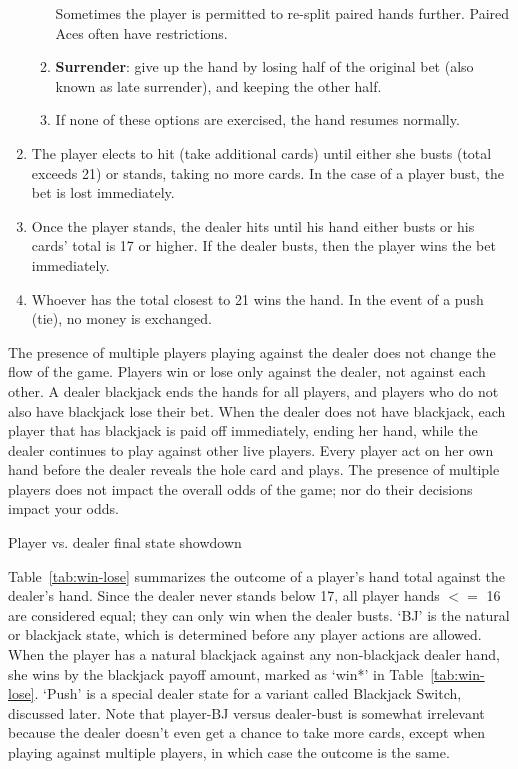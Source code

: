 \begin{enumerate}
\begin{enumerate}
Sometimes the player is permitted to re-split paired hands further.
Paired Aces often have restrictions.  
\item \textbf{Surrender}: give up the hand by losing half of 
the original bet (also known as late surrender), and keeping the other half.
\item If none of these options are exercised, the hand resumes normally.
\end{enumerate}
\item The player elects to hit (take additional cards) until either
she busts (total exceeds 21) or stands, taking no more cards.
In the case of a player bust, the bet is lost immediately.
\item Once the player stands, the dealer hits until his hand either busts
or his cards' total is 17 or higher.  
If the dealer busts, then the player wins the bet immediately.  
\item Whoever has the total closest to 21 wins the hand.
In the event of a push (tie), no money is exchanged.
\end{enumerate}


The presence of multiple players playing against the dealer does not
change the flow of the game.
Players win or lose only against the dealer, not against each other.
A dealer blackjack ends the hands for all players,
and players who do not also have blackjack lose their bet.
When the dealer does not have blackjack,
each player that has blackjack is paid off immediately, ending her hand, 
while the dealer continues to play against other live players.  
Every player act on her own hand before the dealer reveals the 
hole card and plays.  
The presence of multiple players does not impact the overall 
odds of the game; nor do their decisions impact your odds.

\begin{table}[ht!]
\caption{Player vs. dealer final state showdown}
\begin{center}

\end{center}
\label{tab:win-lose}
\end{table}

Table~\ref{tab:win-lose} summarizes the outcome of a player's hand total
against the dealer's hand.
Since the dealer never stands below 17, all player hands $<=$ 16
are considered equal; they can only win when the dealer busts.
`BJ' is the natural or blackjack state, which is determined 
before any player actions are allowed.
When the player has a natural blackjack against any non-blackjack 
dealer hand, she wins by the blackjack payoff amount, marked as `win*'
in Table~\ref{tab:win-lose}.  
`Push' is a special dealer state for a variant called Blackjack Switch, 
discussed later.
Note that player-BJ versus dealer-bust is somewhat irrelevant because
the dealer doesn't even get a chance to take more cards, 
except when playing against multiple players, 
in which case the outcome is the same.  

